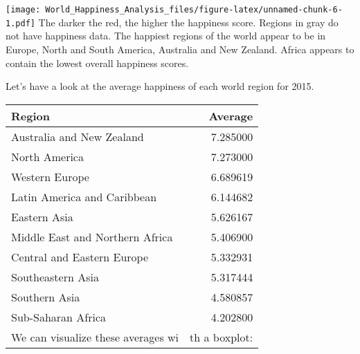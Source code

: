 \documentclass[]{article}
\newenvironment{Shaded}{\begin{snugshade}}{\end{snugshade}}
\newcommand{\DataTypeTok}[1]{\textcolor[rgb]{0.13,0.29,0.53}{#1}}
\newcommand{\KeywordTok}[1]{\textcolor[rgb]{0.13,0.29,0.53}{\textbf{#1}}}
\newcommand{\NormalTok}[1]{#1}
\newcommand{\OperatorTok}[1]{\textcolor[rgb]{0.81,0.36,0.00}{\textbf{#1}}}
\newcommand{\StringTok}[1]{\textcolor[rgb]{0.31,0.60,0.02}{#1}}
\begin{document}
\texttt{[image: World\_Happiness\_Analysis\_files/figure-latex/unnamed-chunk-6-1.pdf]}
The darker the red, the higher the happiness score. Regions in gray do
not have happiness data. The happiest regions of the world appear to be
in Europe, North and South America, Australia and New Zealand. Africa
appears to contain the lowest overall happiness scores.

Let's have a look at the average happiness of each world region for
2015.

\begin{Shaded}
\end{Shaded}

\begin{longtable}[]{@{}lr@{}}
\toprule
Region & Average\tabularnewline
\midrule
\endhead
Australia and New Zealand & 7.285000\tabularnewline
North America & 7.273000\tabularnewline
Western Europe & 6.689619\tabularnewline
Latin America and Caribbean & 6.144682\tabularnewline
Eastern Asia & 5.626167\tabularnewline
Middle East and Northern Africa & 5.406900\tabularnewline
Central and Eastern Europe & 5.332931\tabularnewline
Southeastern Asia & 5.317444\tabularnewline
Southern Asia & 4.580857\tabularnewline
Sub-Saharan Africa & 4.202800\tabularnewline
We can visualize these averages wi & th a boxplot:\tabularnewline
\bottomrule
\end{longtable}
\end{document}
